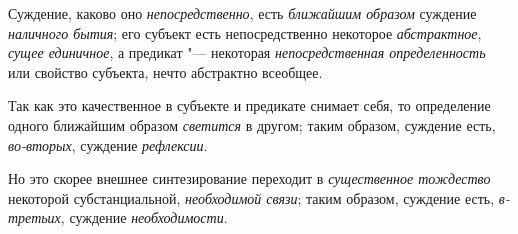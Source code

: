 {Суждение, каково оно
{\em непосредственно},
есть {\em ближайшим
образом} суждение
{\em наличного бытия};
его субъект есть непосредственно некоторое
{\em абстрактное},
{\em сущее единичное}, а
предикат "--- некоторая
{\em непосредственная определенность}
или свойство субъекта, нечто абстрактно всеобщее.

Так как это качественное в субъекте и предикате снимает себя,
то определение одного ближайшим образом
{\em светится} в другом;
таким образом, суждение есть,
{\em во-вторых}, суждение
{\em рефлексии}.

Но это скорее внешнее
синтезирование
переходит в
{\em существенное тождество}
некоторой субстанциальной,
{\em необходимой связи};
таким образом, суждение есть,
{\em в-третьих}, суждение
{\em необходимости}.

}
